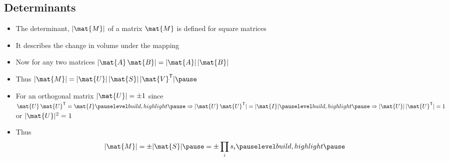 \begin{slide}
\section[-2]{Determinants}

\begin{PauseHighLight}
  \begin{itemize}
  \item The determinant, $|\mat{M}|$ of a matrix $\mat{M}$ is defined
    for square matrices\pause
  \item It describes the change in volume under the mapping\pause
  \item Now for any two matrices $|\mat{A}\,\mat{B}| =
    |\mat{A}|\,|\mat{B}|$\pause
  \item Thus $|\mat{M}| = |\mat{U}| \, |\mat{S}| \, |\mat{V}^\tr|\pause$
  \item For an orthogonal matrix $|\mat{U}| = \pm 1$\pause{} since
    $\mat{U}\,\mat{U}^\tr=\mat{I}\pauseb \Rightarrow
    |\mat{U}\,\mat{U}^\tr| = |\mat{I}|\pauseb \Rightarrow |\mat{U}|\,|\mat{U}^\tr| = 1$\pauseb{} or $|\mat{U}|^2 = 1$\pauseb 
  \item Thus
    \begin{align*}
      |\mat{M}| = \pm |\mat{S}|\pause = \pm \prod_i s_i\pauseb
    \end{align*}
  \end{itemize}
\end{PauseHighLight}

\end{slide}



